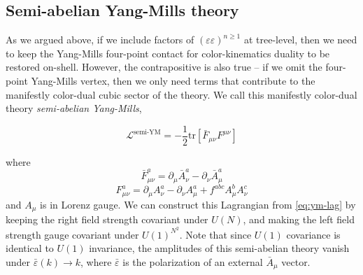 \documentclass[11pt,letter]{article}
\begin{document}
\subsection{Semi-abelian Yang-Mills theory}\label{semiYM}
As we argued above, if we include factors of
$(\varepsilon\varepsilon)^{n\geq 1}$ at tree-level, then we need to
keep the Yang-Mills four-point contact for color-kinematics duality to
be restored on-shell. However, the contrapositive is also true -- if
we omit the four-point Yang-Mills vertex, then we only need terms that
contribute to the manifestly color-dual cubic sector of the theory. We call
this manifestly color-dual theory \textit{semi-abelian Yang-Mills},
\begin{eBox}
\begin{equation}
\label{eq:semiYM}
\mathcal{L}^{\text{semi-YM}} = -\frac{1}{2}\text{tr}\left[\bar{F}_{\mu\nu}F^{\mu\nu}\right]
\end{equation}
\end{eBox}
where
\begin{equation}
\bar{F}^a_{\mu\nu} = \partial_\mu \bar{A}_\nu^a - \partial_\nu \bar{A}_\mu^a
\end{equation}
\begin{equation}
F^a_{\mu\nu} = \partial_\mu A_\nu^a - \partial_\nu A_\mu^a + f^{abc} A_\mu^b A_\nu^c
\end{equation}
and $A_\mu$ is in Lorenz gauge. We can construct this Lagrangian from \cref{eq:ym-lag} by keeping the right field strength covariant under
$U(N)$, and making the left field strength gauge covariant under
$U(1)^{N^2}$. Note that since $U(1)$ covariance is identical to $U(1)$ invariance, the amplitudes of this semi-abelian theory vanish under $\bar{\varepsilon}(k) \rightarrow k$, where $\bar{\varepsilon}$ is the polarization of an external $\bar{A}_\mu$ vector. 
\end{document}
